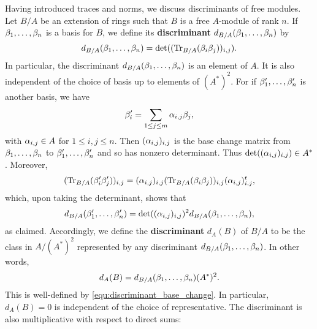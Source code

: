     Having introduced traces and norms, we discuss discriminants of free modules. Let $B/A$ be an extension of rings such that $B$ is a free $A$-module of rank $n$. If $\beta_{1},\ldots,\beta_{n}$ is a basis for $B$, we define its \textbf{discriminant} $d_{B/A}(\beta_{1},\ldots,\beta_{n})$ by
    \[
      d_{B/A}(\beta_{1},\ldots,\beta_{n}) = \det((\operatorname{\mathrm{Tr}}_{B/A}(\beta_{i}\beta_{j}))_{i,j}).
    \]
    In particular, the discriminant $d_{B/A}(\beta_{1},\ldots,\beta_{n})$ is an element of $A$. It is also independent of the choice of basis up to elements of $(A^{\ast})^{2}$. For if $\beta'_{1},\ldots,\beta'_{n}$ is another basis, we have
    \[
      \beta'_{i} = \sum_{1 \le j \le m}\alpha_{i,j}\beta_{j},
    \]
    with $\alpha_{i,j} \in A$ for $1 \le i,j \le n$. Then $(\alpha_{i,j})_{i,j}$ is the base change matrix from $\beta_{1},\ldots,\beta_{n}$ to $\beta'_{1},\ldots,\beta'_{n}$ and so has nonzero determinant. Thus $\det((\alpha_{i,j})_{i,j}) \in A^{\ast}$. Moreover,
    \[
      (\operatorname{\mathrm{Tr}}_{B/A}(\beta'_{i}\beta'_{j}))_{i,j} = (\alpha_{i,j})_{i,j}(\operatorname{\mathrm{Tr}}_{B/A}(\beta_{i}\beta_{j}))_{i,j}(\alpha_{i,j})_{i,j}^{t},
    \]
    which, upon taking the determinant, shows that
    \begin{equation}\label{equ:discriminant_base_change}
      d_{B/A}(\beta'_{1},\ldots,\beta'_{n}) = \det((\alpha_{i,j})_{i,j})^{2}d_{B/A}(\beta_{1},\ldots,\beta_{n}),
    \end{equation}
    as claimed. Accordingly, we define the \textbf{discriminant} $d_{A}(B)$ of $B/A$ to be the class in $A/(A^{\ast})^{2}$ represented by any discriminant $d_{B/A}(\beta_{1},\ldots,\beta_{n})$. In other words,
    \[
      d_{A}(B) = d_{B/A}(\beta_{1},\ldots,\beta_{n})(A^{\ast})^{2}.
    \]
    This is well-defined by \cref{equ:discriminant_base_change}. In particular, $d_{A}(B) = 0$ is independent of the choice of representative. The discriminant is also multiplicative with respect to direct sums:

